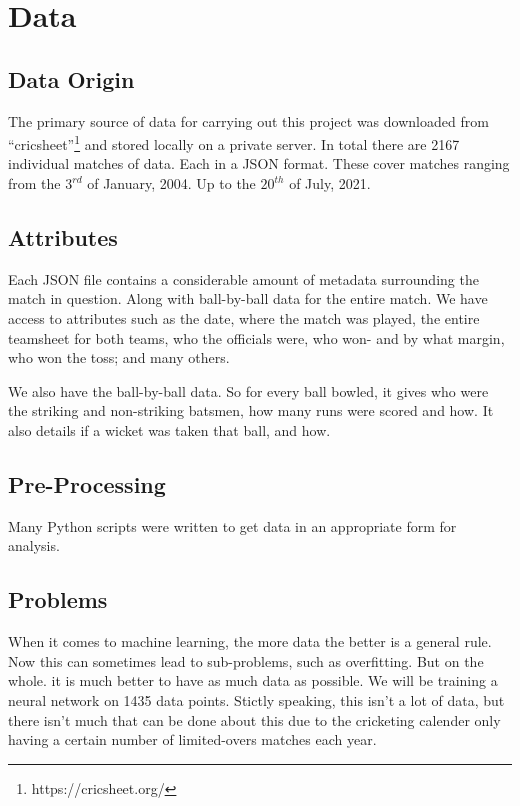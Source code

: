 \chapter{Data}

\section{Data Origin}
The primary source of data for carrying out this project was downloaded from ``cricsheet''\footnote{https://cricsheet.org/}
and stored locally on a private server. In total there are 2167 individual matches of data. Each in a JSON format.
These cover matches ranging from the $3^{rd}$ of January, 2004. Up to the $20^{th}$ of July, 2021.

\section{Attributes}
Each JSON file contains a considerable amount of metadata surrounding the match in question. Along with 
ball-by-ball data for the entire match. We have access to attributes such as the date, where the match was played,
the entire teamsheet for both teams, who the officials were, who won- and by what margin, who won the toss; and many others.

We also have the ball-by-ball data. So for every ball bowled, it gives who were the striking and non-striking batsmen, how many runs
were scored and how. It also details if a wicket was taken that ball, and how.

\section{Pre-Processing}
Many Python scripts were written to get data in an appropriate form for analysis. 

\section{Problems}
When it comes to machine learning, the more data the better is a general rule. Now this can sometimes lead to sub-problems, such as overfitting. But on the whole.
it is much better to have as much data as possible. We will be training a neural network on 1435 data points. Stictly speaking, this isn't a lot of data, but there
isn't much that can be done about this due to the cricketing calender only having a certain number of limited-overs matches each year.

